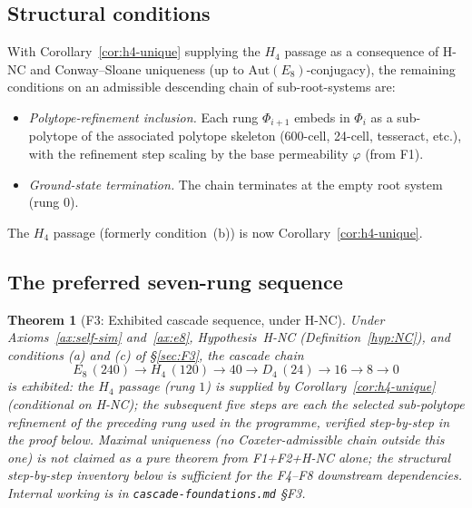 \documentclass[12pt]{article}
\newtheorem{theorem}{Theorem}
\theoremstyle{definition}
\theoremstyle{remark}
\begin{document}
\subsection{Structural conditions}

With Corollary~\ref{cor:h4-unique} supplying the $H_4$ passage as a consequence of H-NC and Conway--Sloane uniqueness (up to $\mathrm{Aut}(E_8)$-conjugacy), the remaining conditions on an admissible descending chain of sub-root-systems are:
\begin{itemize}
\item[\textbf{(a)}] \emph{Polytope-refinement inclusion.} Each rung $\Phi_{i+1}$ embeds in $\Phi_i$ as a sub-polytope of the associated polytope skeleton (600-cell, 24-cell, tesseract, etc.), with the refinement step scaling by the base permeability $\varphi$ (from F1).
\item[\textbf{(c)}] \emph{Ground-state termination.} The chain terminates at the empty root system (rung $0$).
\end{itemize}
The $H_4$ passage (formerly condition~(b)) is now Corollary~\ref{cor:h4-unique}.

\subsection{The preferred seven-rung sequence}

\begin{theorem}[F3: Exhibited cascade sequence, under H-NC]\label{thm:F3}
Under Axioms~\ref{ax:self-sim} and~\ref{ax:e8}, Hypothesis~H-NC (Definition~\ref{hyp:NC}), and conditions \textup{(a)} and \textup{(c)} of \S\ref{sec:F3}, the cascade chain
\begin{equation}\label{eq:7rung}
E_8\,(240) \longrightarrow H_4\,(120) \longrightarrow 40 \longrightarrow D_4\,(24) \longrightarrow 16 \longrightarrow 8 \longrightarrow 0
\end{equation}
is \emph{exhibited}: the $H_4$ passage (rung $1$) is supplied by Corollary~\ref{cor:h4-unique} (conditional on H-NC); the subsequent five steps are each the selected sub-polytope refinement of the preceding rung used in the programme, verified step-by-step in the proof below. Maximal uniqueness (no Coxeter-admissible chain outside this one) is not claimed as a pure theorem from F1+F2+H-NC alone; the structural step-by-step inventory below is sufficient for the F4--F8 downstream dependencies. Internal working is in \texttt{cascade-foundations.md} \S F3.
\end{theorem}
\end{document}
